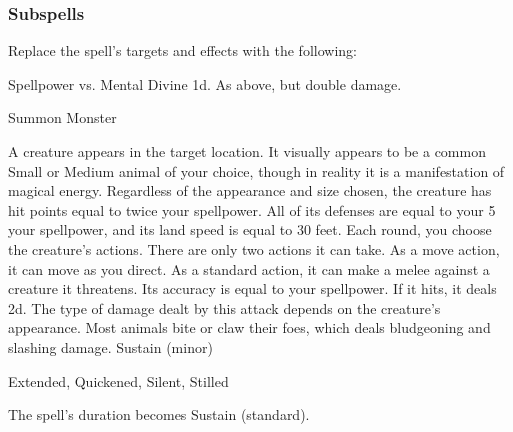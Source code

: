 \subsubsection{Subspells}
Replace the spell's targets and effects with the following:
\begin{spellcontent}
\begin{augmenttargetinginfo}
\end{augmenttargetinginfo}
\begin{augmenteffects}
\begin{spellattack}{Spellpower vs. Mental}
\spellsuccess Divine  \plus1d.
\spellcritical As above, but double damage.
\end{spellattack}
\end{augmenteffects}
\end{spellcontent}
\begin{spellsection}{Summon Monster}
\begin{spellheader}
\end{spellheader}
\begin{spellcontent}
\begin{spelltargetinginfo}
\end{spelltargetinginfo}
\begin{spelleffects}
\spelleffect
A creature appears in the target location.
It visually appears to be a common Small or Medium animal of your choice, though in reality it is a manifestation of magical energy.
Regardless of the appearance and size chosen, the creature has hit points equal to twice your spellpower.
All of its defenses are equal to your 5 \add your spellpower, and its land speed is equal to 30 feet.
Each round, you choose the creature's actions.
There are only two actions it can take.
As a move action, it can move as you direct.
As a standard action, it can make a melee  against a creature it threatens.
Its accuracy is equal to your spellpower.
If it hits, it deals  \minus2d.
The type of damage dealt by this attack depends on the creature's appearance.
Most animals bite or claw their foes, which deals bludgeoning and slashing damage.
\spelldur Sustain (minor)
\end{spelleffects}
\end{spellcontent}
\begin{spellfooter}
 Extended, Quickened, Silent, Stilled
\end{spellfooter}
\begin{spellsubcontent}
\begin{spellcantrip}
The spell's duration becomes Sustain (standard).
\end{spellcantrip}
\end{spellsubcontent}
\end{spellsection}

